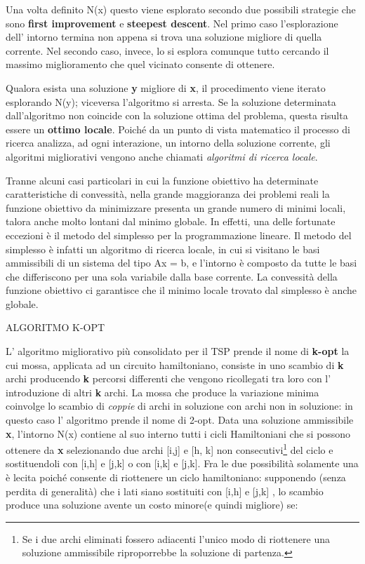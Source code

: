 \documentclass[11pt]{article}
\begin{document}
Una volta definito N(x) questo viene esplorato secondo due possibili strategie che sono \textbf{first improvement} e \textbf{steepest descent}. Nel primo caso l'esplorazione dell' intorno termina non appena si trova una soluzione migliore di quella corrente. Nel secondo caso, invece, lo si esplora comunque tutto cercando il massimo miglioramento che quel vicinato consente di ottenere. 

Qualora esista una soluzione \textbf{y} migliore di \textbf{x}, il procedimento viene iterato esplorando N(y); viceversa  l'algoritmo si arresta. Se la soluzione determinata dall'algoritmo non coincide con la soluzione ottima del problema, questa risulta essere un \textbf{ottimo locale}. Poiché da un punto di vista matematico il processo di ricerca analizza, ad ogni interazione, un intorno della soluzione corrente, gli algoritmi migliorativi vengono anche chiamati\emph{ algoritmi di ricerca locale}.

Tranne alcuni casi particolari in cui la funzione obiettivo ha determinate caratteristiche di convessità, nella grande maggioranza dei problemi reali la funzione obiettivo da minimizzare presenta un grande numero di minimi locali, talora anche molto lontani dal minimo globale. In effetti, una delle fortunate eccezioni è il metodo del simplesso per la programmazione lineare. Il metodo del simplesso è infatti un algoritmo di ricerca locale, in cui si visitano le basi ammissibili di un sistema del tipo Ax = b, e l'intorno è composto da tutte le basi che differiscono per una sola variabile dalla  base corrente. La convessità della funzione obiettivo ci garantisce che il minimo locale trovato dal simplesso è anche globale.

\vspace{2\baselineskip}
ALGORITMO K-OPT
\vspace{2\baselineskip}

L' algoritmo migliorativo più consolidato per il TSP  prende il nome di \textbf{k-opt} la cui mossa, applicata ad un circuito hamiltoniano, consiste in uno scambio di \textbf{k} archi producendo \textbf{k} percorsi differenti che vengono ricollegati tra loro con l' introduzione di altri \textbf{k} archi. La mossa che produce la variazione minima coinvolge lo scambio di \emph{coppie} di archi in soluzione con archi non in soluzione: in questo caso l' algoritmo prende il nome di 2-opt. Data una soluzione ammissibile \textbf{x}, l'intorno N(x) contiene al suo interno tutti i cicli Hamiltoniani che si possono ottenere da \textbf{x} selezionando due archi  [i,j] e [h, k] non consecutivi\footnote{Se i due archi eliminati fossero adiacenti l'unico modo di riottenere una soluzione ammissibile riproporrebbe la soluzione di partenza.} del ciclo e sostituendoli con [i,h] e [j,k] o con [i,k] e [j,k]. Fra le due possibilità solamente una è lecita poiché consente di riottenere un ciclo hamiltoniano: supponendo (senza perdita di generalità) che i lati siano sostituiti con [i,h] e [j,k] , lo scambio produce una soluzione avente un costo minore(e quindi migliore) se: 
\end{document}
